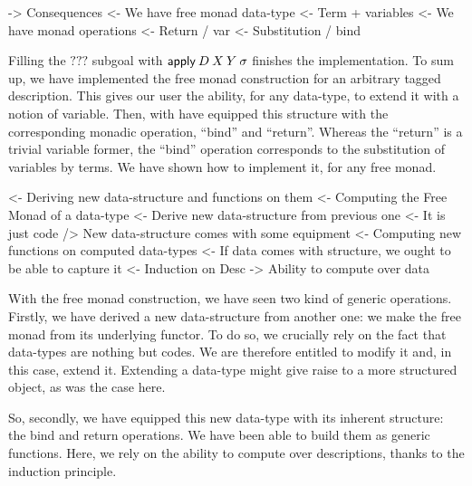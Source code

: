 \begin{wstructure}
    -> Consequences
        <- We have free monad data-type
            <- Term + variables
        <- We have monad operations
            <- Return / var
            <- Substitution / bind
\end{wstructure}

Filling the $???$ subgoal with $\apply\: D\: X\: Y\: \sigma$ finishes
the implementation. To sum up, we have implemented the free monad
construction for an arbitrary tagged description. This gives our user
the ability, for any data-type, to extend it with a notion of
variable. Then, with have equipped this structure with the
corresponding monadic operation, ``bind'' and ``return''. Whereas the
``return'' is a trivial variable former, the ``bind'' operation
corresponds to the substitution of variables by terms. We have shown
how to implement it, for any free monad.


\begin{wstructure}
<- Deriving new data-structure and functions on them
    <- Computing the Free Monad of a data-type
        <- Derive new data-structure from previous one
            <- It is just code
        /> New data-structure comes with some equipment
    <- Computing new functions on computed data-types
        <- If data comes with structure, we ought to be able to capture it
            <- Induction on Desc
            -> Ability to compute over data
\end{wstructure}

With the free monad construction, we have seen two kind of generic
operations. Firstly, we have derived a new data-structure from another
one: we make the free monad from its underlying functor. To do so, we
crucially rely on the fact that data-types are nothing but codes. We
are therefore entitled to modify it and, in this case, extend
it. Extending a data-type might give raise to a more
structured object, as was the case here. 

So, secondly, we have equipped this new data-type with its inherent
structure: the bind and return operations. We have been able to build
them as generic functions. Here, we rely on the ability to compute
over descriptions, thanks to the induction principle.
